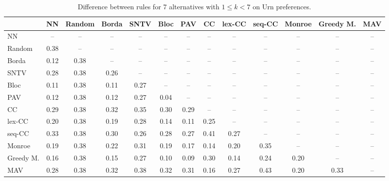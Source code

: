 
\begin{table*}[htbp]
\centering
\begin{tabular}{lcccccccccccc}
\toprule
 & NN & Random & Borda & SNTV & Bloc & PAV & CC & lex-CC & seq-CC & Monroe & Greedy M. & MAV \\
\midrule
NN & -- & -- & -- & -- & -- & -- & -- & -- & -- & -- & -- & -- \\
Random & \cellcolor{blue!38} 0.38 & -- & -- & -- & -- & -- & -- & -- & -- & -- & -- & -- \\
Borda & \cellcolor{blue!12} 0.12 & \cellcolor{blue!38} 0.38 & -- & -- & -- & -- & -- & -- & -- & -- & -- & -- \\
SNTV & \cellcolor{blue!28} 0.28 & \cellcolor{blue!38} 0.38 & \cellcolor{blue!26} 0.26 & -- & -- & -- & -- & -- & -- & -- & -- & -- \\
Bloc & \cellcolor{blue!11} 0.11 & \cellcolor{blue!38} 0.38 & \cellcolor{blue!11} 0.11 & \cellcolor{blue!27} 0.27 & -- & -- & -- & -- & -- & -- & -- & -- \\
PAV & \cellcolor{blue!12} 0.12 & \cellcolor{blue!38} 0.38 & \cellcolor{blue!12} 0.12 & \cellcolor{blue!27} 0.27 & \cellcolor{blue!4} 0.04 & -- & -- & -- & -- & -- & -- & -- \\
CC & \cellcolor{blue!28} 0.29 & \cellcolor{blue!38} 0.38 & \cellcolor{blue!32} 0.32 & \cellcolor{blue!35} 0.35 & \cellcolor{blue!30} 0.30 & \cellcolor{blue!28} 0.29 & -- & -- & -- & -- & -- & -- \\
lex-CC & \cellcolor{blue!20} 0.20 & \cellcolor{blue!38} 0.38 & \cellcolor{blue!19} 0.19 & \cellcolor{blue!28} 0.28 & \cellcolor{blue!14} 0.14 & \cellcolor{blue!11} 0.11 & \cellcolor{blue!25} 0.25 & -- & -- & -- & -- & -- \\
seq-CC & \cellcolor{blue!33} 0.33 & \cellcolor{blue!38} 0.38 & \cellcolor{blue!30} 0.30 & \cellcolor{blue!26} 0.26 & \cellcolor{blue!28} 0.28 & \cellcolor{blue!27} 0.27 & \cellcolor{blue!41} 0.41 & \cellcolor{blue!27} 0.27 & -- & -- & -- & -- \\
Monroe & \cellcolor{blue!19} 0.19 & \cellcolor{blue!38} 0.38 & \cellcolor{blue!22} 0.22 & \cellcolor{blue!31} 0.31 & \cellcolor{blue!19} 0.19 & \cellcolor{blue!17} 0.17 & \cellcolor{blue!14} 0.14 & \cellcolor{blue!20} 0.20 & \cellcolor{blue!35} 0.35 & -- & -- & -- \\
Greedy M. & \cellcolor{blue!16} 0.16 & \cellcolor{blue!38} 0.38 & \cellcolor{blue!15} 0.15 & \cellcolor{blue!27} 0.27 & \cellcolor{blue!10} 0.10 & \cellcolor{blue!9} 0.09 & \cellcolor{blue!30} 0.30 & \cellcolor{blue!14} 0.14 & \cellcolor{blue!24} 0.24 & \cellcolor{blue!20} 0.20 & -- & -- \\
MAV & \cellcolor{blue!28} 0.28 & \cellcolor{blue!38} 0.38 & \cellcolor{blue!32} 0.32 & \cellcolor{blue!38} 0.38 & \cellcolor{blue!32} 0.32 & \cellcolor{blue!31} 0.31 & \cellcolor{blue!16} 0.16 & \cellcolor{blue!27} 0.27 & \cellcolor{blue!43} 0.43 & \cellcolor{blue!20} 0.20 & \cellcolor{blue!33} 0.33 & -- \\
\bottomrule
\end{tabular}

\caption{Difference between rules for 7 alternatives with $1 \leq k < 7$ on Urn preferences.}
\label{tab:rule_distance_heatmap-m=[7]-pref_dist=URN-R}
\end{table*}
    